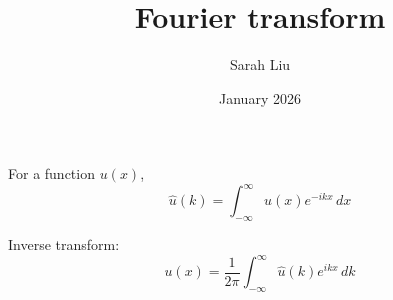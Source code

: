 \documentclass{article}
\title{Fourier transform}
\author{Sarah Liu}
\date{January 2026}
\begin{document}
\maketitle

For a function $u(x)$,
\[
\widehat{u}(k)
= \int_{-\infty}^{\infty} u(x)e^{-ikx}\,dx
\]

Inverse transform:
\[
u(x)
= \frac{1}{2\pi}
\int_{-\infty}^{\infty}
\widehat{u}(k)e^{ikx}\,dk
\]
\end{document}
